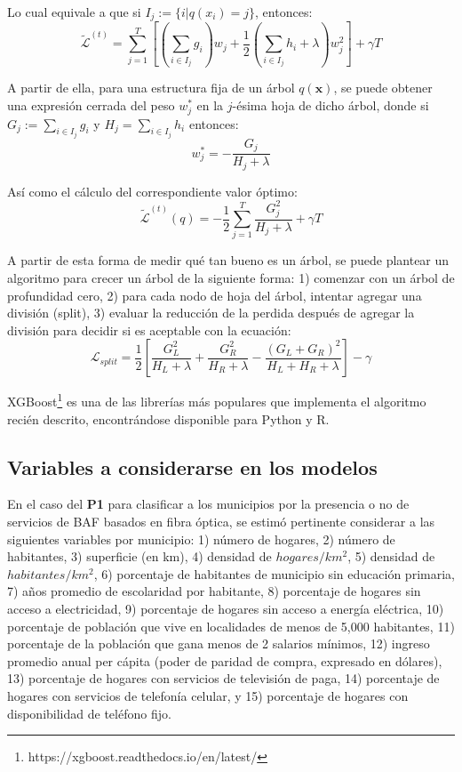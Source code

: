 \documentclass[9pt,twocolumn,twoside]{ilcss}
\begin{document}
Lo cual equivale a que si $I_j := \{i|q(x_i)=j\}$, entonces:
\begin{equation}
\tilde{{\mathcal L}}^{(t)} =\sum^T_{j=1} [(\sum_{i\in I_j} g_i) w_j + \frac{1}{2} (\sum_{i\in I_j} h_i + \lambda) w_j^2 ] + \gamma T
\end{equation}

A partir de ella, para una estructura fija de un árbol $q(\mathbf{x})$, se puede obtener una expresión cerrada del peso $w_j^*$ en la $j$-ésima hoja de dicho árbol, donde si $G_j := \sum_{i\in I_j} g_i$ y $H_j = \sum_{i\in I_j} h_i$ entonces:
\begin{equation}
w_j^\ast = -\frac{G_j}{H_j+\lambda}
\end{equation}

Así como el cálculo del correspondiente valor óptimo:
\begin{equation}
{\tilde{{\mathcal L}}^{(t)}}(q) = -\frac{1}{2} \sum_{j=1}^T \frac{G_j^2}{H_j+\lambda} + \gamma T
\end{equation}

A partir de esta forma de medir qué tan bueno es un árbol, se puede plantear un algoritmo
para crecer un árbol de la siguiente forma: 1) comenzar con un árbol de profundidad cero, 2) para cada nodo de hoja del árbol, intentar agregar una división (split), 3) evaluar la reducción de la perdida después de agregar la división para decidir si es aceptable con la ecuación:
$$\mathcal{L}_{split} = \frac{1}{2} \left[\frac{G_L^2}{H_L+\lambda}+\frac{G_R^2}{H_R+\lambda}-\frac{(G_L+G_R)^2}{H_L+H_R+\lambda}\right] - \gamma$$

XGBoost\footnote{https://xgboost.readthedocs.io/en/latest/}  es una de las librerías más populares que implementa el algoritmo recién descrito, encontrándose disponible para Python y R.

\subsection{Variables a considerarse en los modelos}

En el caso del \textbf{P1} para clasificar a los municipios por la presencia o no de servicios de BAF basados en fibra óptica, se estimó pertinente considerar a las siguientes variables por municipio: 1) número de hogares, 2) número de habitantes, 3) superficie (en km), 4) densidad de $hogares/km^2$, 5) densidad de $habitantes/km^2$, 6) porcentaje de habitantes de municipio sin educación primaria, 7) años promedio de escolaridad por habitante, 8) porcentaje de hogares sin acceso a electricidad,  9) porcentaje de hogares sin acceso a energía eléctrica, 10) porcentaje de población que vive en localidades de menos de 5,000 habitantes, 11) porcentaje de la población que gana menos de 2 salarios mínimos, 12) ingreso promedio anual per cápita (poder de paridad de compra, expresado en dólares), 13) porcentaje de hogares con servicios de televisión de paga, 14) porcentaje de hogares con servicios de telefonía celular, y 15) porcentaje de hogares con disponibilidad de teléfono fijo.
\end{document}
